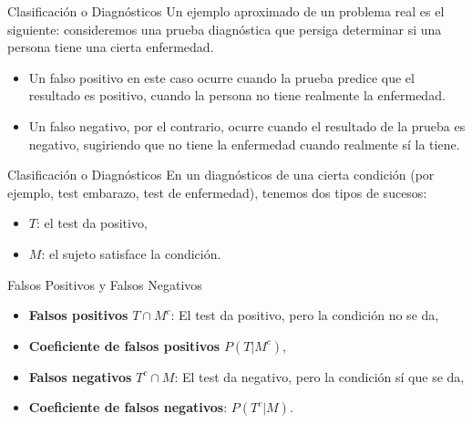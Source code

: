 \documentclass[
  ignorenonframetext,
  aspectratio=169]{beamer}
\providecommand{\tightlist}{%
  \setlength{\itemsep}{0pt}\setlength{\parskip}{0pt}}\usepackage{longtable,booktabs,array}
\begin{document}
\begin{frame}{Clasificación o Diagnósticos}
\label{clasificaciuxf3n-o-diagnuxf3sticos-4}
Un ejemplo aproximado de un problema real es el siguiente: consideremos
una prueba diagnóstica que persiga determinar si una persona tiene una
cierta enfermedad.

\begin{itemize}
\tightlist
\item
  Un falso positivo en este caso ocurre cuando la prueba predice que el
  resultado es positivo, cuando la persona no tiene realmente la
  enfermedad.
\item
  Un falso negativo, por el contrario, ocurre cuando el resultado de la
  prueba es negativo, sugiriendo que no tiene la enfermedad cuando
  realmente sí la tiene.
\end{itemize}
\end{frame}

\begin{frame}{Clasificación o Diagnósticos}
\label{clasificaciuxf3n-o-diagnuxf3sticos-5}
En un diagnósticos de una cierta condición (por ejemplo, test embarazo,
test de enfermedad), tenemos dos tipos de sucesos:

\begin{itemize}
\tightlist
\item
  \(T\): el test da positivo,
\item
  \(M\): el sujeto satisface la condición.
\end{itemize}

Falsos Positivos y Falsos Negativos

\begin{itemize}
\tightlist
\item
  \textbf{Falsos positivos} \(T\cap M^c\): El test da positivo, pero la
  condición no se da,
\item
  \textbf{Coeficiente de falsos positivos} \(P(T|M^c)\),
\item
  \textbf{Falsos negativos} \(T^c\cap M\): El test da negativo, pero la
  condición sí que se da,
\item
  \textbf{Coeficiente de falsos negativos}: \(P(T^c|M)\).
\end{itemize}
\end{frame}
\end{document}

